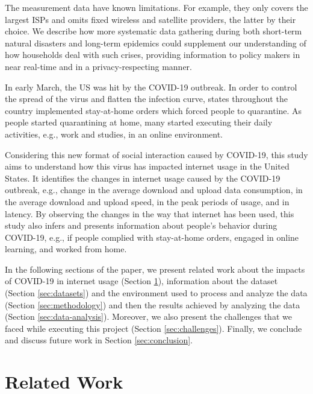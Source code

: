 \documentclass[conference,10pt]{IEEEtran}
\begin{document}
The measurement data have known limitations. For example, they only covers the largest ISPs and omits fixed wireless and satellite providers, the latter by their choice. We describe how more systematic data gathering during both short-term natural disasters and long-term epidemics could supplement our understanding of how households deal with such crises, providing information to policy makers in near real-time and in a privacy-respecting manner.


In early March, the US was hit by the COVID-19 outbreak. In order to control the spread of the virus and flatten the infection curve, states throughout the country implemented stay-at-home orders which forced people to quarantine. As people started quarantining at home, many started executing their daily activities, e.g., work and studies, in an online environment.

Considering this new format of social interaction caused by COVID-19, this study aims to understand how this virus has impacted internet usage in the United States. It identifies the changes in internet usage caused by the COVID-19 outbreak, e.g., change in the average download and upload data consumption, in the average download and upload speed, in the peak periods of usage, and in latency. By observing the changes in the way that internet has been used, this study also infers and presents information about people's behavior during COVID-19, e.g., if people complied with stay-at-home orders, engaged in online learning, and worked from home.

In the following sections of the paper, we present related work about the impacts of COVID-19 in internet usage (Section \ref{sec:related-work}), information about the dataset (Section \ref{sec:datasets}) and the environment used to process and analyze the data (Section \ref{sec:methodology}) and then the results achieved by analyzing the data (Section \ref{sec:data-analysis}). Moreover, we also present the challenges that we faced while executing this project (Section \ref{sec:challenges}). Finally, we conclude and discuss future work in Section \ref{sec:conclusion}.

\section{Related Work}
\label{sec:related-work}
\end{document}
